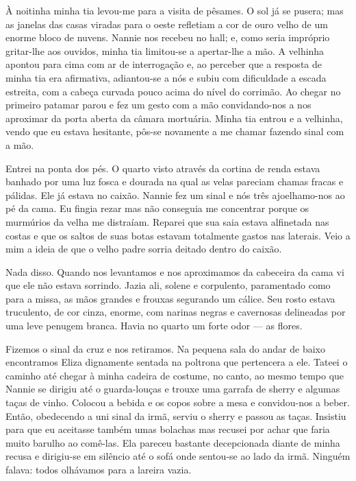 À noitinha minha tia levou-me para a visita de pêsames. O sol já se
pusera; mas as janelas das casas viradas para o oeste refletiam
a cor de ouro velho de um enorme bloco de nuvens. Nannie nos recebeu
no hall; e, como seria impróprio gritar-lhe aos ouvidos, minha tia
limitou-se a apertar-lhe a mão. A velhinha apontou para cima com ar de
interrogação e, ao perceber que a resposta de minha tia era
afirmativa, adiantou-se a nós e subiu com dificuldade a escada
estreita, com a cabeça curvada pouco acima do nível do corrimão. Ao
chegar no primeiro patamar parou e fez um gesto com a mão
convidando-nos a nos aproximar da porta aberta da câmara mortuária.
Minha tia entrou e a velhinha, vendo que eu estava hesitante, pôs-se
novamente a me chamar fazendo sinal com a mão.

Entrei na ponta dos pés. O quarto visto através da cortina de renda
estava banhado por uma luz fosca e dourada na qual as velas pareciam
chamas fracas e pálidas. Ele já estava no caixão. Nannie fez um sinal
e nós três ajoelhamo-nos ao pé da cama. Eu fingia rezar mas não
conseguia me concentrar porque os murmúrios da velha me distraíam.
Reparei que sua saia estava alfinetada nas costas e que os saltos de
suas botas estavam totalmente gastos nas laterais. Veio a mim a ideia
de que o velho padre sorria deitado dentro do caixão.

Nada disso. Quando nos levantamos e nos aproximamos da cabeceira da
cama vi que ele não estava sorrindo. Jazia ali, solene e corpulento,
paramentado como para a missa, as mãos grandes e frouxas segurando um
cálice. Seu rosto estava truculento, de cor cinza, enorme, com narinas
negras e cavernosas delineadas por uma leve penugem branca. Havia no
quarto um forte odor --- as flores.

Fizemos o sinal da cruz e nos retiramos. Na pequena sala do andar de
baixo encontramos Eliza dignamente sentada na poltrona que
pertencera a ele. Tateei o caminho até chegar à minha cadeira de
costume, no canto, ao mesmo tempo que Nannie se dirigiu até o
guarda-louças e trouxe uma garrafa de sherry e algumas taças de vinho.
Colocou a bebida e os copos sobre a mesa e convidou-nos a beber.
Então, obedecendo a uni sinal da irmã, serviu o sherry e passou as
taças. Insistiu para que eu aceitasse também umas bolachas mas recusei
por achar que faria muito barulho ao comê-las. Ela pareceu bastante
decepcionada diante
de minha recusa e dirigiu-se em silêncio até o sofá onde sentou-se ao
lado da irmã. Ninguém falava: todos olhávamos para a lareira vazia.

